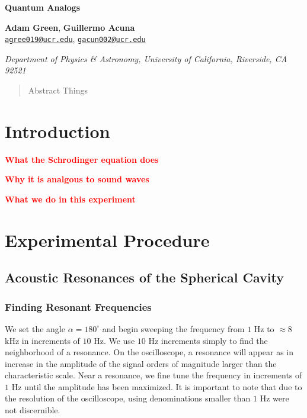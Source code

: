 \documentclass[12pt]{article}
\newcommand{\red}[1]{\textbf{\textcolor{red}{#1}}} %
\renewcommand{\deg}{^\circ}
\newcommand{\email}[1]{\href{mailto:#1}{#1}}
\newenvironment{institutions}[1][2em]{\begin{list}{}{\setlength\leftmargin{#1}\setlength\rightmargin{#1}}\item[]}{\end{list}}
\begin{document}
	
\begin{center}

	{\huge \bf Quantum Analogs}
	
	\vspace{0.5cm}
	
	\textbf{Adam Green}, \textbf{Guillermo Acuna}\\
	
	\texttt{\footnotesize \email{agree019@ucr.edu}},
	\texttt{\footnotesize \email{gacun002@ucr.edu}}
	
	\vspace{0.5cm}
	
	
	\begin{institutions}[2.25cm]
		\footnotesize
		{\it 
			Department of Physics \& Astronomy, 
			University of  California, Riverside, 
			{CA} 92521	    
		}    
	\end{institutions}

	\vspace{0.5cm}
	
\end{center}

	\vspace{0.5cm}

\begin{abstract}
Abstract Things	
\end{abstract}
	
	\section{Introduction}
	\red{What the Schrodinger equation does}
	
	\red{Why it is analgous to sound waves}
	
	\red{What we do in this experiment}
	
	\section{Experimental Procedure}
	
		\subsection{Acoustic Resonances of the Spherical Cavity}
		
			\subsubsection{Finding Resonant Frequencies}
			We set the angle $\alpha = 180 \deg$ and begin sweeping the frequency from $1$ Hz to $\approx 8$ kHz in increments of $10$ Hz. We use $10$ Hz increments simply to find the neighborhood of a resonance. On the oscilloscope, a resonance will appear as in increase in the amplitude of the signal orders of magnitude larger than the characteristic scale. Near a resonance, we fine tune the frequency in increments of $1$ Hz until the amplitude has been maximized. It is important to note that due to the resolution of the oscilloscope, using denominations smaller than $1$ Hz were not discernible.
			
\end{document}
